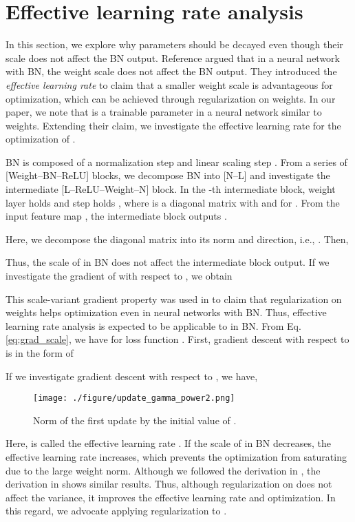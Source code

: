 \documentclass{article}
\begin{document}
\section{Effective learning rate analysis}
\label{sec:effectivelearningrateanalysis}
In this section, we explore why  parameters should be decayed even though their scale does not affect the BN output. Reference \cite{gcorr/Laarhoven17b,gnips/HofferBGS18,giclr/ZhangWXG19} argued that in a neural network with BN, the weight scale does not affect the BN output. They introduced the \emph{effective learning rate} to claim that a smaller weight scale is advantageous for optimization, which can be achieved through  regularization on weights. In our paper, we note that  is a trainable parameter in a neural network similar to weights. Extending their claim, we investigate the effective learning rate for the optimization of .

BN is composed of a normalization step  and linear scaling step . From a series of [Weight--BN--ReLU] blocks, we decompose BN into [N--L] and investigate the intermediate [L--ReLU--Weight--N] block. In the -th intermediate block, weight layer holds  and  step holds , where  is a diagonal matrix with  and  for . From the input feature map , the intermediate block outputs .

Here, we decompose the diagonal matrix into its norm and direction, i.e., . Then,


Thus, the scale of  in BN does not affect the intermediate block output. If we investigate the gradient of  with respect to , we obtain


This scale-variant gradient property was used in \cite{gcorr/Laarhoven17b,gnips/HofferBGS18} to claim that  regularization on weights helps optimization even in neural networks with BN. Thus, effective learning rate analysis is expected to be applicable to  in BN. From Eq. \ref{eq:grad_scale}, we have  for loss function . First, gradient descent with respect to  is in the form of


If we investigate gradient descent with respect to , we have,


\begin{wrapfigure}{r}{0.26\textwidth}
	\centering
\texttt{[image: ./figure/update\_gamma\_power2.png]}
    \caption{Norm of the first update by the initial value of .}
    \label{fig:update}
\end{wrapfigure}

Here,  is called the effective learning rate \cite{gcorr/Laarhoven17b,gnips/HofferBGS18}. If the scale of  in BN decreases, the effective learning rate increases, which prevents the optimization from saturating due to the large weight norm. Although we followed the derivation in \cite{gcorr/Laarhoven17b}, the derivation in \cite{gnips/HofferBGS18} shows similar results. Thus, although  regularization on  does not affect the variance, it improves the effective learning rate and optimization. In this regard, we advocate applying  regularization to .
\end{document}
